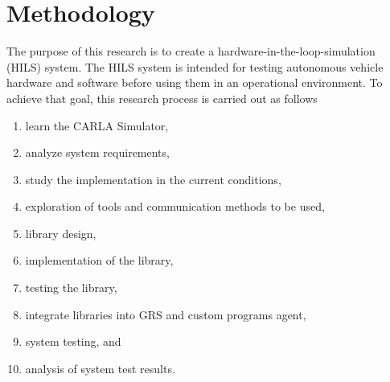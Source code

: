 \section{Methodology}

The purpose of this research is to create a hardware-in-the-loop-simulation
(HILS) system. The HILS system is intended for testing autonomous vehicle
hardware and software before using them in an operational environment. To
achieve that goal, this research process is carried out as follows

\begin{enumerate}
	\item learn the CARLA Simulator,
	\item analyze system requirements,
	\item study the implementation in the current conditions,
	\item exploration of tools and communication methods to be used,
	\item library design,
	\item implementation of the library,
	\item testing the library,
	\item integrate libraries into GRS and custom programs agent,
	\item system testing, and
	\item analysis of system test results.
\end{enumerate}